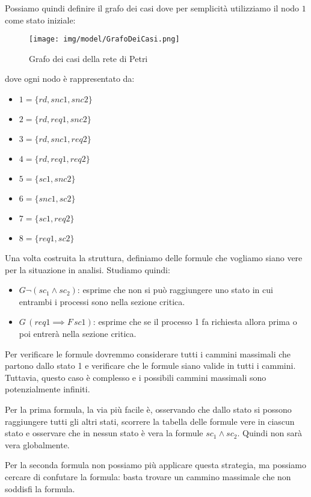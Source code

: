 \begin{esempio}
    Possiamo quindi definire il grafo dei casi dove per semplicità utilizziamo il
    nodo $1$ come stato iniziale:
    \begin{figure}[!ht]
        \centering
        \texttt{[image: img/model/GrafoDeiCasi.png]}
        \caption{Grafo dei casi della rete di Petri}
    \end{figure}
    dove ogni nodo è rappresentato da:
    \begin{itemize}
        \item $1=\{rd,snc1,snc2\}$
        \item $2=\{rd,req1,snc2\}$
        \item $3=\{rd,snc1,req2\}$
        \item $4=\{rd,req1,req2\}$
        \item $5=\{sc1, snc2\}$
        \item $6=\{snc1,sc2\}$
        \item $7=\{sc1, req 2\}$
        \item $8=\{req1,sc2\}$
    \end{itemize}
    Una volta costruita la struttura, definiamo delle formule che vogliamo siano
    vere per la situazione in analisi. Studiamo quindi:
    \begin{itemize}
        \item $G\lnot (sc_1\land sc_2)$: esprime che non si può raggiungere
              uno stato in cui entrambi i processi sono nella sezione critica.
        \item $G\,(req1\implies F\,sc1)$: esprime che se il processo 1 fa richiesta
              allora prima o poi entrerà nella sezione critica.
    \end{itemize}
    Per verificare le formule dovremmo considerare tutti i cammini massimali che
    partono dallo stato 1 e verificare che le formule siano valide in tutti i
    cammini. Tuttavia, questo caso è complesso e i possibili cammini massimali
    sono potenzialmente infiniti.

    Per la prima formula, la via più facile è, osservando che dallo stato si possono raggiungere tutti
    gli altri stati, scorrere la tabella delle formule vere in ciascun stato e
    osservare che in nessun stato è vera la formule $sc_1 \land sc_2$. Quindi non 
    sarà vera globalmente.

    Per la seconda formula non possiamo più applicare questa strategia, ma possiamo
    cercare di confutare la formula: basta trovare un cammino massimale che non
    soddisfi la formula.


\end{esempio}
